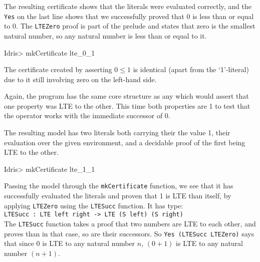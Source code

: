         \newpage
        
        
        The resulting certificate shows that the literals were evaluated correctly, and the \texttt{Yes} on the last line shows that we successfully proved that 0 is less than or equal to 0. The \texttt{LTEZero} proof is part of the \Idris prelude and states that zero is the smallest natural number, so any natural number is less than or equal to it.
        
        \begin{code}
Idris> mkCertificate lte_0_1
        \end{code}
        
        The certificate created by asserting $0 \leq 1$ is identical (apart from the `1'-literal) due to it still involving zero on the left-hand side.
        
        
        
        Again, the program has the same core structure as any which would assert that one property was LTE to the other. This time both properties are 1 to test that the operator works with the immediate successor of 0.
        
        \newpage
        
        
        The resulting \Idris model has two literals both carrying their the value 1, their evaluation over the given environment, and a decidable proof of the first being LTE to the other.
        
        \begin{code}
Idris> mkCertificate lte_1_1
        \end{code}
        
        Passing the model through the \texttt{mkCertificate} function, we see that it has successfully evaluated the literals and proven that 1 is LTE than itself, by applying \texttt{LTEZero} using the \texttt{LTESucc} function. It has type:\\
        \texttt{LTESucc : LTE left right -> LTE (S left) (S right)}\\
        The \texttt{LTESucc} function takes a proof that two numbers are LTE to each other, and proves than in that case, so are their successors. So \texttt{Yes (LTESucc LTEZero)} says that since 0 is LTE to any natural number $n$, $(0 + 1)$ is LTE to any natural number $(n + 1)$.
        

